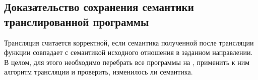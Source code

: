 \subsection{Доказательство сохранения семантики транслированной программы}

Трансляция считается корректной, если семантика полученной после трансляции функции совпадает с семантикой исходного отношения в заданном направлении.
В целом, для этого необходимо перебрать все программы на \miniKanren{}, применить к ним алгоритм трансляции и проверить, изменилось ли семантика.

